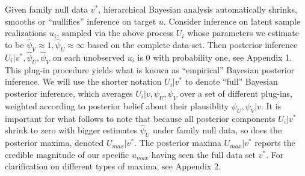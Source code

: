 \documentclass{article}
\begin{document}
Given family null data $v^*$, hierarchical Bayesian analysis automatically shrinks, smooths or ``nullifies'' inference on target $u$. Consider inference on latent sample realizations $u_i$, sampled via the above process $U_i$ whose parameters we estimate to be $\hat{\psi}_V \approx 1, \hat{\psi}_U \approx \infty$ based on the complete data-set. Then posterior inference $U_i|v^*,\hat{\psi}_U, \hat{\psi}_V$ on each unobserved $u_i$ is $0$ with probability one, see Appendix 1. This plug-in procedure yields what is known as ``empirical'' Bayesian posterior inference. We will use the shorter notation $U_i|v^*$ to denote  ``full'' Bayesian posterior inference, which averages $U_i|v,\psi_U,\psi_V$ over a set of different plug-ins, weighted according to posterior belief about their plausiblity $\psi_U,\psi_V|v$.
It is important for what follows to note that because all posterior components $U_i|v^*$ shrink to zero with bigger estimates $\hat{\psi}_U$ under family null data, so does the posterior maxima, denoted $U_{max}|v^*$. The posterior maxima $U_{max}|v^*$ reports the credible magnitude of our specific $u_{max}$ having seen the full data set $v^*$. For clarification on different types of maxima, see Appendix 2.  
\end{document}
